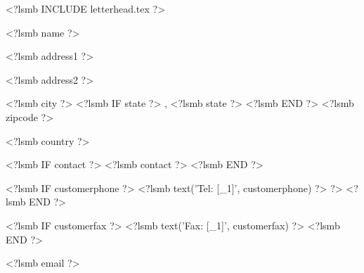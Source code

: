\documentclass{scrartcl}
\begin{document}
\pagestyle{myheadings}
\thispagestyle{empty}

\fontsize{10pt}{12pt}\selectfont

\newsavebox{\ftr}

<?lsmb INCLUDE letterhead.tex ?>


%
%  
%
%
%


\vspace*{0.5cm}

\parbox[t]{.5\textwidth}{

<?lsmb name ?>

<?lsmb address1 ?>

<?lsmb address2 ?>

<?lsmb city ?>
<?lsmb IF state ?>
\hspace{-0.1cm}, <?lsmb state ?>
<?lsmb END ?>
<?lsmb zipcode ?>

<?lsmb country ?>

\vspace{0.3cm}

<?lsmb IF contact ?>
<?lsmb contact ?>
\vspace{0.2cm}
<?lsmb END ?>

<?lsmb IF customerphone ?>
<?lsmb text('Tel: [_1]', customerphone) ?> ?>
<?lsmb END ?>

<?lsmb IF customerfax ?>
<?lsmb text('Fax: [_1]', customerfax) ?>
<?lsmb END ?>

<?lsmb email ?>
}
\end{document}
